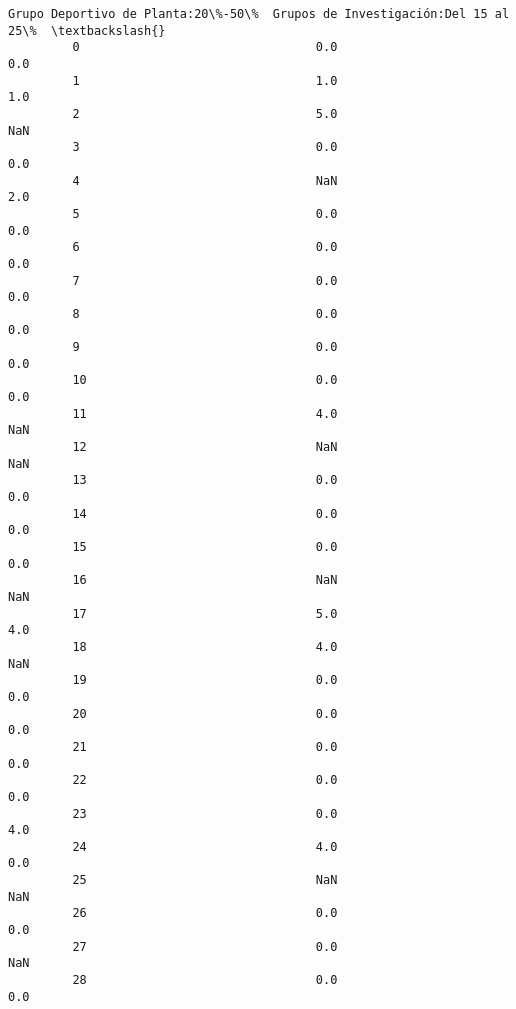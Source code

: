 \documentclass[11pt]{article}
\begin{document}
\begin{Verbatim}[commandchars=\\\{\}]
             Grupo Deportivo de Planta:20\%-50\%  Grupos de Investigación:Del 15 al 25\%  \textbackslash{}
         0                                 0.0                                    0.0   
         1                                 1.0                                    1.0   
         2                                 5.0                                    NaN   
         3                                 0.0                                    0.0   
         4                                 NaN                                    2.0   
         5                                 0.0                                    0.0   
         6                                 0.0                                    0.0   
         7                                 0.0                                    0.0   
         8                                 0.0                                    0.0   
         9                                 0.0                                    0.0   
         10                                0.0                                    0.0   
         11                                4.0                                    NaN   
         12                                NaN                                    NaN   
         13                                0.0                                    0.0   
         14                                0.0                                    0.0   
         15                                0.0                                    0.0   
         16                                NaN                                    NaN   
         17                                5.0                                    4.0   
         18                                4.0                                    NaN   
         19                                0.0                                    0.0   
         20                                0.0                                    0.0   
         21                                0.0                                    0.0   
         22                                0.0                                    0.0   
         23                                0.0                                    4.0   
         24                                4.0                                    0.0   
         25                                NaN                                    NaN   
         26                                0.0                                    0.0   
         27                                0.0                                    NaN   
         28                                0.0                                    0.0   

\end{Verbatim}
\end{document}
